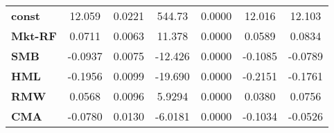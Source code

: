 \begin{center}
\begin{tabular}{lcccccc}
\midrule
\textbf{const}  &       12.059       &       0.0221       &      544.73     &      0.0000      &       12.016      &       12.103       \\
\textbf{Mkt-RF} &       0.0711       &       0.0063       &      11.378     &      0.0000      &       0.0589      &       0.0834       \\
\textbf{SMB}    &      -0.0937       &       0.0075       &     -12.426     &      0.0000      &      -0.1085      &      -0.0789       \\
\textbf{HML}    &      -0.1956       &       0.0099       &     -19.690     &      0.0000      &      -0.2151      &      -0.1761       \\
\textbf{RMW}    &       0.0568       &       0.0096       &      5.9294     &      0.0000      &       0.0380      &       0.0756       \\
\textbf{CMA}    &      -0.0780       &       0.0130       &     -6.0181     &      0.0000      &      -0.1034      &      -0.0526       \\
\bottomrule
\end{tabular}
\end{center}
